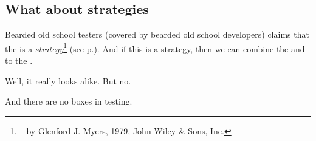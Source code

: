 \subsection{What about strategies}

Bearded old school testers (covered by bearded old school developers) claims that the  is a \emph{strategy}\footnote{~ by Glenford J. Myers, 1979, John Wiley \& Sons, Inc.} (see  p.\pageref{sec:Strategy}). And if this is a strategy, then we can combine the  and  to the .

Well, it really looks alike. But no.

And there are no  boxes in testing.
